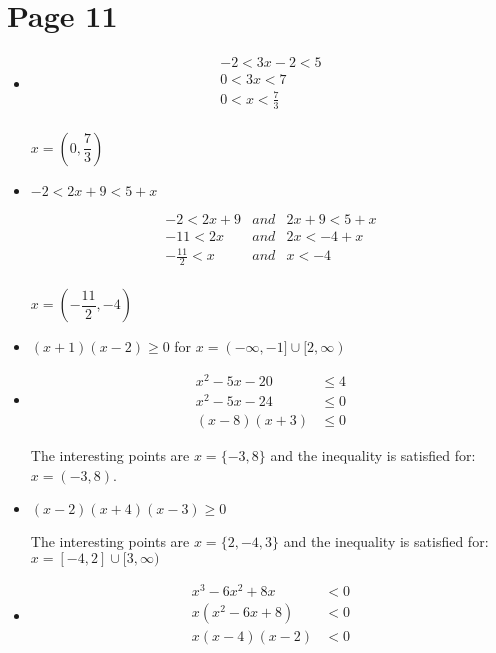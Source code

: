 \documentclass[fleqn,addpoints]{exam}
\begin{document}
\section{Page 11}
\begin{itemize}

\item[13]
\begin{align*}
  -2 < 3x - 2 < 5 \\
  0 < 3x  < 7 \\
  0 < x < \frac{7}{3} \\
\end{align*}

$x = \left(0, \dfrac{7}{3} \right)$

\item[14]
$-2 < 2x + 9 < 5 + x$

\begin{eqnarray*}
  -2 < 2x + 9 & and & 2x + 9 < 5 + x \\
  -11 < 2x    & and & 2x < -4 + x \\
  -\frac{11}{2} < x  & and & x < -4 \\
\end{eqnarray*}

$x = \left( -\dfrac{11}{2}, -4 \right)$

\item[15]
$(x+1)(x-2) \geq 0$ for $x = (-\infty, -1] \cup [2, \infty)$

\item[16]
\begin{align*}
  x^2 - 5x - 20 & \leq 4 \\
  x^2 - 5x - 24 & \leq 0 \\
  (x-8)(x+3) & \leq 0
\end{align*}

The interesting points are $x= \{-3, 8\}$ and the inequality is satisfied for: $x = (-3, 8)$.

\item[17]
$(x-2)(x+4)(x-3) \geq 0$ 

The interesting points are $x=\{2, -4, 3\}$ and the inequality is satisfied for: $x = [-4, 2] \cup [3, \infty)$

\item[18]
\begin{align*}
  x^3-6x^2+8x &< 0 \\
  x(x^2-6x+8) &< 0 \\
  x(x-4)(x-2) &< 0 \\
\end{align*}


\end{itemize}
\end{document}
